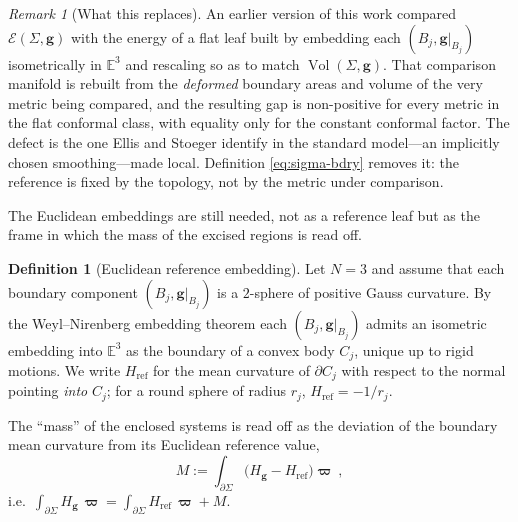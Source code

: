 \documentclass[aps,prd,reprint,amsmath,amssymb,nofootinbib,longbibliography]{revtex4-2}
\DeclareMathOperator{\Vol}{Vol}
\newcommand{\Eucl}{\mathbb{E}}
\newcommand{\g}{\mathbf{g}}                 %
\newcommand{\bvol}{\boldsymbol{\varpi}}     %
\newcommand{\Href}{H_{\mathrm{ref}}}
\newcommand{\EH}{\mathcal{E}}               %
\theoremstyle{plain}
\theoremstyle{definition}
\newtheorem{definition}[theorem]{Definition}
\theoremstyle{remark}
\newtheorem{remark}[theorem]{Remark}
\begin{document}
\begin{remark}[What this replaces]
\label{rem:old-reference}
An earlier version of this work compared $\EH(\Sigma,\g)$ with the energy of a flat leaf built by embedding each $(B_j,\g|_{B_j})$ isometrically in $\Eucl^3$ and rescaling so as to match $\Vol(\Sigma,\g)$. That comparison manifold is rebuilt from the \emph{deformed} boundary areas and volume of the very metric being compared, and the resulting gap is non-positive for every metric in the flat conformal class, with equality only for the constant conformal factor. The defect is the one Ellis and Stoeger \cite{EllisStoeger1987} identify in the standard model---an implicitly chosen smoothing---made local. Definition \eqref{eq:sigma-bdry} removes it: the reference is fixed by the topology, not by the metric under comparison.
\end{remark}

The Euclidean embeddings are still needed, not as a reference leaf but as the frame in which the mass of the excised regions is read off.

\begin{definition}[Euclidean reference embedding]
\label{def:reference}
Let $N=3$ and assume that each boundary component $(B_j,\g|_{B_j})$ is a $2$-sphere of positive Gauss curvature. By the Weyl--Nirenberg embedding theorem \cite{MR58265} each $(B_j,\g|_{B_j})$ admits an isometric embedding into $\Eucl^3$ as the boundary of a convex body $C_j$, unique up to rigid motions. We write $\Href$ for the mean curvature of $\partial C_j$ with respect to the normal pointing \emph{into} $C_j$; for a round sphere of radius $r_j$, $\Href=-1/r_j$.
\end{definition}

The ``mass'' of the enclosed systems is read off as the deviation of the boundary mean curvature from its Euclidean reference value,
\begin{equation}
\label{eq:mass-def}
M := \int_{\partial\Sigma}\big(H_\g-\Href\big)\bvol\ ,
\end{equation}
i.e.\ $\int_{\partial \Sigma} H_\g \, \bvol = \int_{\partial \Sigma}\Href\, \bvol +  M$.
\end{document}
